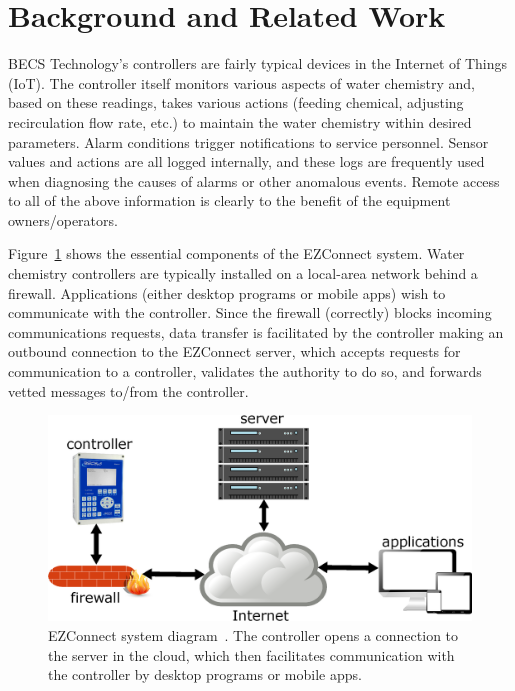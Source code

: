 \section{Background and Related Work}
\label{sec:background}

BECS Technology's controllers are fairly typical devices
in the Internet of Things (IoT).
The controller itself monitors various aspects of water chemistry
and, based on these readings, takes various actions
(feeding chemical, adjusting recirculation flow rate, etc.) to maintain
the water chemistry within desired parameters.
Alarm conditions trigger notifications to service personnel.
Sensor values and actions are all logged internally,
and these logs are frequently used when diagnosing the causes
of alarms or other anomalous events.
Remote access to all of the above information is
clearly to the benefit of the equipment owners/operators.

Figure~\ref{ezconnect} shows the essential components of the EZConnect
system.
Water chemistry controllers are typically installed on a local-area network
behind a firewall.
Applications (either desktop programs or mobile apps) wish to communicate
with the controller.  Since the firewall (correctly) blocks incoming
communications requests, data transfer is facilitated by the controller
making an outbound connection to the EZConnect server, which accepts
requests for communication to a controller, validates the authority to do
so, and forwards vetted messages to/from the controller.

\begin{figure}[htbp]
 \center
\includegraphics[width=\columnwidth]{EZConnect}
    \caption{EZConnect system diagram~\protect\cite{ezconnect}. The controller
opens a connection to the server in the cloud, which then facilitates communication with the controller by desktop programs or mobile apps.}
    \label{ezconnect}
\end{figure}

